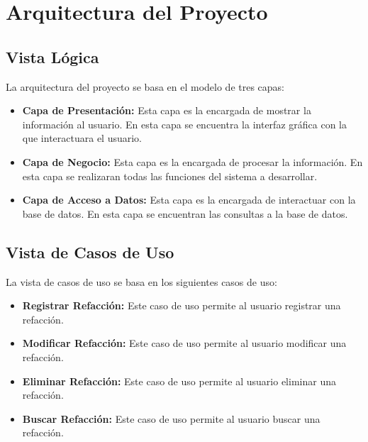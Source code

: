 \section*{Arquitectura del Proyecto}

\subsection*{Vista Lógica}
La arquitectura del proyecto se basa en el modelo de tres capas: 
\begin{itemize}
    \item \textbf{Capa de Presentación:} Esta capa es la encargada de mostrar la información al usuario. 
    En esta capa se encuentra la interfaz gráfica con la que interactuara el usuario.
    \newline
    \begin{center}
            

    \end{center}
     \item \textbf{Capa de Negocio:} Esta capa es la encargada de procesar la información. 
    En esta capa se realizaran todas las funciones del sistema a desarrollar.
    \newline
     \begin{center}
    \end{center}
    \item \textbf{Capa de Acceso a Datos:} Esta capa es la encargada de interactuar con la base de datos. 
    En esta capa se encuentran las consultas a la base de datos.
    \newline
    \begin{center}
    \end{center}
\end{itemize}

\subsection*{Vista de Casos de Uso}

    La vista de casos de uso se basa en los siguientes casos de uso:
    \begin{itemize}
        \item \textbf{Registrar Refacción:} Este caso de uso permite al usuario registrar una refacción.
        \item \textbf{Modificar Refacción:} Este caso de uso permite al usuario modificar una refacción.
        \item \textbf{Eliminar Refacción:} Este caso de uso permite al usuario eliminar una refacción.
        \item \textbf{Buscar Refacción:} Este caso de uso permite al usuario buscar una refacción.
    \end{itemize}

